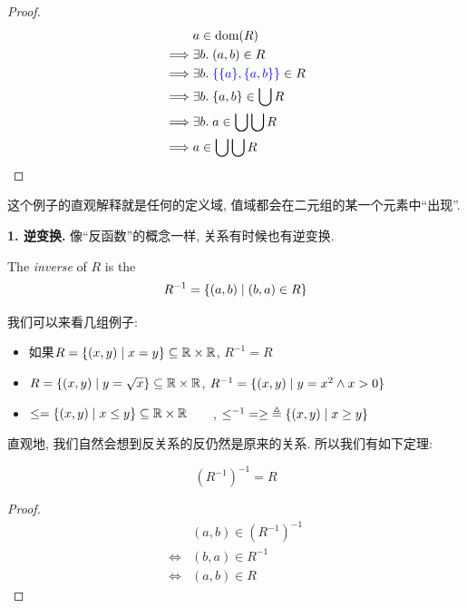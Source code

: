 \begin{proof}
    \begin{align*}
      &a \in \text{dom}(R) \\
      \implies& \exists b.\; (a, b) \in R \\
      \implies& \exists b.\; \textcolor{blue}{\{\{a\}, \{a, b\}\}} \in R \\
      \implies& \exists b.\; \{a, b\} \in \bigcup R \\
      \implies& \exists b.\; a \in \bigcup\bigcup R \\
      \implies& a \in \bigcup\bigcup R
    \end{align*}
\end{proof}

这个例子的直观解释就是任何的定义域, 值域都会在二元组的某一个元素中``出现''. 


\textbf{1. 逆变换. }像``反函数''的概念一样, 关系有时候也有逆变换. 

\begin{definition}[逆 (Inverse)]
  The {\it inverse} of $R$ is the 
  \[
    R^{-1} = \{(a, b) \mid (b, a) \in R\}
  \]
\end{definition}

我们可以来看几组例子: 
\begin{itemize}
  \item 如果$R = \{(x, y) \mid x = y\}\subseteq \mathbb{R} \times \mathbb{R}$, $R^{-1} = R$
  \item $R = \{(x, y) \mid y = \sqrt{x}\} \subseteq \mathbb{R} \times \mathbb{R}$, $R^{-1} = \{(x, y) \mid y = x^{2} \land x > 0\}$
  \item $\le = \{(x, y) \mid x \le y\} \subseteq \mathbb{R} \times \mathbb{R} \qquad$, $\le^{-1} \;= \ge \;\triangleq \{(x, y) \mid x \ge y\}$
\end{itemize}

直观地, 我们自然会想到反关系的反仍然是原来的关系. 所以我们有如下定理: 

\begin{theorem}
  \[
    (R^{-1})^{-1} = R
  \]
\end{theorem}

\begin{proof}
  \setcounter{equation}{0}
  \begin{align*}
    &(a, b) \in (R^{-1})^{-1} \\
    \iff& (b, a) \in R^{-1} \\
    \iff& (a, b) \in R
  \end{align*}
\end{proof}

